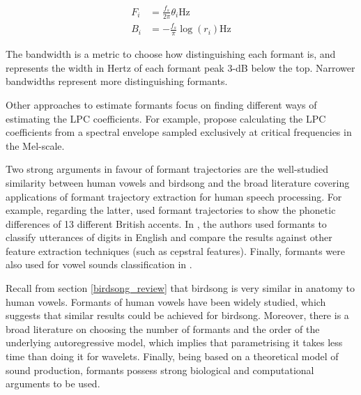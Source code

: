 \documentclass[../main.tex]{subfiles} \label{chapter_soa}
\begin{document}
\begin{align*}
F_i &= \frac{f_s}{2\pi}\theta_i \text{Hz}\\
B_i &= -\frac{f_s}{\pi}\log{(r_i)} \text{Hz}
\end{align*}
\par The bandwidth is a metric to choose how distinguishing each formant is, and represents the width in Hertz of each formant peak 3-dB below the top. Narrower bandwidths represent more distinguishing formants. 
\par Other approaches to estimate formants focus on finding different ways of estimating the LPC coefficients. For example, \cite{Darch,Araujo1998} propose calculating the LPC coefficients from a spectral envelope sampled exclusively at critical frequencies in the Mel-scale.
\par Two strong arguments in favour of formant trajectories are the well-studied similarity between human vowels and birdsong and the broad literature covering applications of formant trajectory extraction for human speech processing. For example, regarding the latter, \cite{Ferragne2010} used formant trajectories to show the phonetic differences of 13 different British accents. In \cite{Holmes1895}, the authors used formants to classify utterances of digits in English and compare the results against other feature extraction techniques (such as cepstral features). Finally, formants were also used for vowel sounds classification in \cite{markel1976}.
\par Recall from section \ref{birdsong_review} that birdsong is very similar in anatomy to human vowels. Formants of human vowels have been widely studied, which suggests that similar results could be achieved for birdsong. Moreover, there is a broad literature on choosing the number of formants and the order of the underlying autoregressive model, which implies that parametrising it takes less time than doing it for wavelets. Finally, being based on a theoretical model of sound production, formants possess strong biological and computational arguments to be used.
\end{document}
